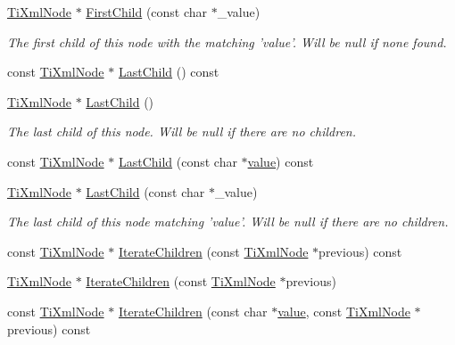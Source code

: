 \begin{DoxyCompactItemize}
\item 
\hyperlink{class_ti_xml_node}{TiXmlNode} $\ast$ \hyperlink{class_ti_xml_node_abc8bf32be6419ec453a731868de19554}{FirstChild} (const char $\ast$\_\-value)
\begin{DoxyCompactList}\small\item\em The first child of this node with the matching 'value'. Will be null if none found. \item\end{DoxyCompactList}\item 
const \hyperlink{class_ti_xml_node}{TiXmlNode} $\ast$ \hyperlink{class_ti_xml_node_a6d671107e00cca1d28cb2d7f3a87a21e}{LastChild} () const 
\item 
\hyperlink{class_ti_xml_node}{TiXmlNode} $\ast$ \hyperlink{class_ti_xml_node_a6432d2b2495f6caf9cb4278df706a031}{LastChild} ()
\begin{DoxyCompactList}\small\item\em The last child of this node. Will be null if there are no children. \item\end{DoxyCompactList}\item 
const \hyperlink{class_ti_xml_node}{TiXmlNode} $\ast$ \hyperlink{class_ti_xml_node_acdd3fdc436aa7433023310a041e5e63f}{LastChild} (const char $\ast$\hyperlink{class_ti_xml_node_aead528b3cedc33c16a6c539872c7cc8b}{value}) const 
\item 
\hyperlink{class_ti_xml_node}{TiXmlNode} $\ast$ \hyperlink{class_ti_xml_node_abad5bf1059c48127b958711ef89e8e5d}{LastChild} (const char $\ast$\_\-value)
\begin{DoxyCompactList}\small\item\em The last child of this node matching 'value'. Will be null if there are no children. \item\end{DoxyCompactList}\item 
const \hyperlink{class_ti_xml_node}{TiXmlNode} $\ast$ \hyperlink{class_ti_xml_node_aaef7ac3978c4bb1cc8a24ffae7bced75}{IterateChildren} (const \hyperlink{class_ti_xml_node}{TiXmlNode} $\ast$previous) const 
\item 
\hyperlink{class_ti_xml_node}{TiXmlNode} $\ast$ \hyperlink{class_ti_xml_node_a2358e747118fdbf0e467b1e4f7d03de1}{IterateChildren} (const \hyperlink{class_ti_xml_node}{TiXmlNode} $\ast$previous)
\item 
const \hyperlink{class_ti_xml_node}{TiXmlNode} $\ast$ \hyperlink{class_ti_xml_node_af2b86dbe25d3d26fa48180edc5e2a9fc}{IterateChildren} (const char $\ast$\hyperlink{class_ti_xml_node_aead528b3cedc33c16a6c539872c7cc8b}{value}, const \hyperlink{class_ti_xml_node}{TiXmlNode} $\ast$previous) const 

\end{DoxyCompactItemize}
